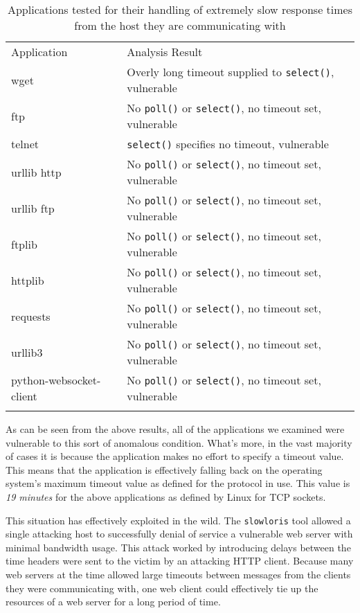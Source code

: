 \begin{table*}[t]
  \scriptsize{}
  \begin{tabular}{l | l}
    \toprule{}
    Application              & Analysis Result\\
    wget                     & Overly long timeout supplied to {\tt select()}, vulnerable\\
    ftp                      & No {\tt poll()} or {\tt select()}, no timeout set, vulnerable\\
    telnet                   & {\tt select()} specifies no timeout, vulnerable\\
    urllib http              & No {\tt poll()} or {\tt select()}, no timeout set, vulnerable\\
    urllib ftp               & No {\tt poll()} or {\tt select()}, no timeout set, vulnerable\\
    ftplib                   & No {\tt poll()} or {\tt select()}, no timeout set, vulnerable\\
    httplib                  & No {\tt poll()} or {\tt select()}, no timeout set, vulnerable\\
    requests                 & No {\tt poll()} or {\tt select()}, no timeout set, vulnerable\\
    urllib3                  & No {\tt poll()} or {\tt select()}, no timeout set, vulnerable\\
    python-websocket-client  & No {\tt poll()} or {\tt select()}, no timeout set, vulnerable\\
    \bottomrule{}
  \end{tabular}
  \caption{Applications tested for their handling of extremely slow response
    times from the host they are communicating with}
  \label{table:slowloris}
\end{table*}


As can be seen from the above results, all of the applications we examined were
vulnerable to this sort of anomalous condition.  What's more, in the vast
majority of cases it is because the application makes no effort to specify a
timeout value.  This means that the application is effectively falling back on
the operating system's maximum timeout value as defined for the protocol in
use.  This value is \emph{19 minutes} for the above applications as defined by
Linux for TCP sockets.

This situation has effectively exploited in the wild.  The {\tt slowloris} tool
allowed a single attacking host to successfully denial of service a vulnerable
web server with minimal bandwidth usage.  This attack worked by introducing
delays between the time headers were sent to the victim by an attacking HTTP
client.  Because many web servers at the time allowed large timeouts between
messages from the clients they were communicating with, one web client could
effectively tie up the resources of a web server for a long period of time.

